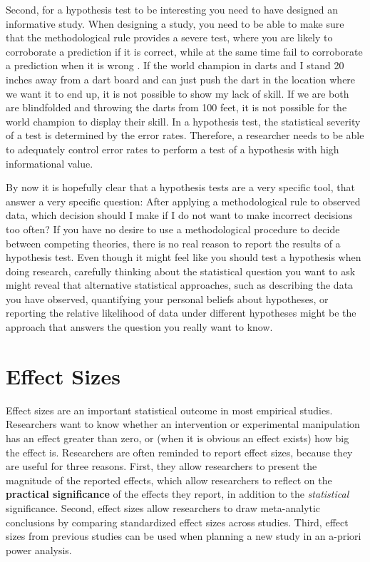 \documentclass[
]{krantz}
\begin{document}
Second, for a hypothesis test to be interesting you need to have designed an informative study. When designing a study, you need to be able to make sure that the methodological rule provides a severe test, where you are likely to corroborate a prediction if it is correct, while at the same time fail to corroborate a prediction when it is wrong \citep{mayo_statistical_2018}. If the world champion in darts and I stand 20 inches away from a dart board and can just push the dart in the location where we want it to end up, it is not possible to show my lack of skill. If we are both are blindfolded and throwing the darts from 100 feet, it is not possible for the world champion to display their skill. In a hypothesis test, the statistical severity of a test is determined by the error rates. Therefore, a researcher needs to be able to adequately control error rates to perform a test of a hypothesis with high informational value.

By now it is hopefully clear that a hypothesis tests are a very specific tool, that answer a very specific question: After applying a methodological rule to observed data, which decision should I make if I do not want to make incorrect decisions too often? If you have no desire to use a methodological procedure to decide between competing theories, there is no real reason to report the results of a hypothesis test. Even though it might feel like you should test a hypothesis when doing research, carefully thinking about the statistical question you want to ask might reveal that alternative statistical approaches, such as describing the data you have observed, quantifying your personal beliefs about hypotheses, or reporting the relative likelihood of data under different hypotheses might be the approach that answers the question you really want to know.

\hypertarget{effectsize}{%
\chapter{Effect Sizes}\label{effectsize}}

Effect sizes are an important statistical outcome in most empirical studies. Researchers want to know whether an intervention or experimental manipulation has an effect greater than zero, or (when it is obvious an effect exists) how big the effect is. Researchers are often reminded to report effect sizes, because they are useful for three reasons. First, they allow researchers to present the magnitude of the reported effects, which allow researchers to reflect on the \textbf{practical significance} of the effects they report, in addition to the \emph{statistical} significance. Second, effect sizes allow researchers to draw meta-analytic conclusions by comparing standardized effect sizes across studies. Third, effect sizes from previous studies can be used when planning a new study in an a-priori power analysis.
\end{document}
